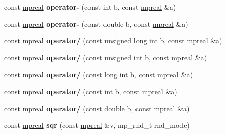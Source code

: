 \begin{DoxyCompactItemize}
\item 
\mbox{\label{classmpfr_1_1mpreal_a3d3f06bd4408bc323a089296bd296b53}} 
const \hyperlink{classmpfr_1_1mpreal}{mpreal} {\bfseries operator-\/} (const int b, const \hyperlink{classmpfr_1_1mpreal}{mpreal} \&a)
\item 
\mbox{\label{classmpfr_1_1mpreal_a84b3fb2edee90cb4b747adbf00a506f1}} 
const \hyperlink{classmpfr_1_1mpreal}{mpreal} {\bfseries operator-\/} (const double b, const \hyperlink{classmpfr_1_1mpreal}{mpreal} \&a)
\item 
\mbox{\label{classmpfr_1_1mpreal_a4891f7a777282e55f91af3d9d028811c}} 
const \hyperlink{classmpfr_1_1mpreal}{mpreal} {\bfseries operator/} (const unsigned long int b, const \hyperlink{classmpfr_1_1mpreal}{mpreal} \&a)
\item 
\mbox{\label{classmpfr_1_1mpreal_a6d31a063369ed841d9ab2fa5d6fb9f2b}} 
const \hyperlink{classmpfr_1_1mpreal}{mpreal} {\bfseries operator/} (const unsigned int b, const \hyperlink{classmpfr_1_1mpreal}{mpreal} \&a)
\item 
\mbox{\label{classmpfr_1_1mpreal_a7e4a3cdf7ed1044458a6f0930b7e32e2}} 
const \hyperlink{classmpfr_1_1mpreal}{mpreal} {\bfseries operator/} (const long int b, const \hyperlink{classmpfr_1_1mpreal}{mpreal} \&a)
\item 
\mbox{\label{classmpfr_1_1mpreal_add6578941a4a40daa2b63a30b8f1f3ce}} 
const \hyperlink{classmpfr_1_1mpreal}{mpreal} {\bfseries operator/} (const int b, const \hyperlink{classmpfr_1_1mpreal}{mpreal} \&a)
\item 
\mbox{\label{classmpfr_1_1mpreal_a78d18d7f0d69c2f0c5127251965d597f}} 
const \hyperlink{classmpfr_1_1mpreal}{mpreal} {\bfseries operator/} (const double b, const \hyperlink{classmpfr_1_1mpreal}{mpreal} \&a)
\item 
\mbox{\label{classmpfr_1_1mpreal_a91d62cb2564c294a7dc7fd06c078b4f2}} 
const \hyperlink{classmpfr_1_1mpreal}{mpreal} {\bfseries sqr} (const \hyperlink{classmpfr_1_1mpreal}{mpreal} \&v, mp\+\_\+rnd\+\_\+t rnd\+\_\+mode)
\item 

\end{DoxyCompactItemize}
